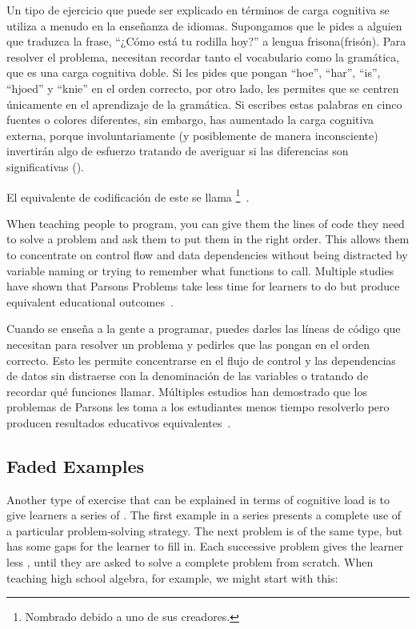 Un tipo de ejercicio que puede ser explicado en términos de carga cognitiva 
se utiliza a menudo en la enseñanza de idiomas.
Supongamos que le pides a alguien que traduzca la frase, 
``¿Cómo está tu rodilla hoy?'' a lengua frisona(frisón).
Para resolver el problema, necesitan recordar tanto el vocabulario 
como la gramática, que es una carga cognitiva doble.
Si les pides que pongan ``hoe'', ``har'', ``is'', ``hjoed'' y ``knie'' en el orden correcto, 
por otro lado, les permites que se centren únicamente en el aprendizaje de la gramática.
Si escribes estas palabras en cinco fuentes o colores diferentes, 
sin embargo, has aumentado la carga cognitiva externa, porque involuntariamente 
(y posiblemente de manera inconsciente) invertirán algo de esfuerzo tratando de averiguar 
si las diferencias son significativas ().


El equivalente de codificación de este
se llama \footnote{Nombrado debido a uno de sus creadores.}~\cite{Pars2006}.

When teaching people to program,
you can give them the lines of code they need to solve a problem
and ask them to put them in the right order.
This allows them to concentrate on control flow and data dependencies
without being distracted by variable naming or trying to remember what functions to call.
Multiple studies have shown that Parsons Problems take less time for learners to do
but produce equivalent educational outcomes~\cite{Eric2017}.

Cuando se enseña a la gente a programar,
puedes darles las líneas de código que necesitan para resolver un problema
y pedirles que las pongan en el orden correcto.
Esto les permite concentrarse en el flujo de control y las dependencias de datos
sin distraerse con la denominación de las variables o tratando de recordar qué funciones llamar.
Múltiples estudios han demostrado que los problemas de Parsons les toma a los estudiantes menos tiempo resolverlo
pero producen resultados educativos equivalentes~\cite{Eric2017}.


\subsection*{Faded Examples}

Another type of exercise that can be explained in terms of cognitive load
is to give learners a series of .
The first example in a series presents a complete use of a particular problem-solving strategy.
The next problem is of the same type,
but has some gaps for the learner to fill in.
Each successive problem gives the learner less ,
until they are asked to solve a complete problem from scratch.
When teaching high school algebra,
for example,
we might start with this:

